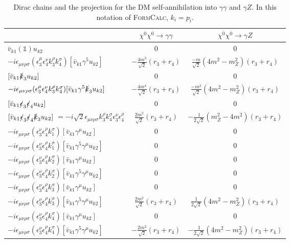 \begin{table}
\centering
\begin{tabular}{|l|c|c|}\hline
& $\chi^0\chi^0\rightarrow\gamma\gamma$ & $\chi^0\chi^0\rightarrow\gamma Z$ \\ \hline \hline
$\bar{v}_{k1}(\mathds{1})u_{k2}$ &  $ 0$ &0 \\ \hline
$-i\epsilon_{\mu\nu\rho\sigma}(\epsilon_3^{\mu}\epsilon_4^{\nu}k_3^{\rho}k_4^{\sigma})[\bar{v}_{k1}\gamma^5u_{k2}]$  & $ -\tfrac{4m^3}{\sqrt{2}}(r_3+r_4)$ &
$\tfrac{-m}{\sqrt{2}}(4m^2-m_Z^2)(r_3+r_4)$\\ \hline 
$[\bar{v}_{k1}\slashed{k}_3u_{k2}]$  & $ 0$ &0\\ \hline 
$-i\epsilon_{\mu\nu\rho\sigma}(\epsilon_3^{\mu}\epsilon_4^{\nu}k_3^{\rho}k_4^{\sigma})[\bar{v}_{k1}\gamma^5\slashed{k}_3u_{k2}]$  & $-\tfrac{4m^4}{\sqrt{2}}(r_3+r_4)$ &
$\tfrac{-m^2}{\sqrt{2}}(4m^2-m_Z^2)(r_3+r_4)$\\ \hline 
$[\bar{v}_{k1}\slashed{\epsilon}_3\slashed{\epsilon}_4u_{k2}]$  &$ 0$ &0\\ \hline 
$[\bar{v}_{k1}\slashed{\epsilon}_3\slashed{\epsilon}_4\slashed{k}_3u_{k2}]$ 
$=-i\sqrt{2}\epsilon_{\mu\nu\rho\sigma}k_3^{\rho}k_4^{\sigma}\epsilon_3^{\nu}\epsilon_4^{\rho}$  & $\tfrac{2m^2}{\sqrt{2}}(r_3+r_4)$ & $ -\tfrac{1}{2\sqrt{2}}(m_Z^2-4m^2)(r_3+r_4)$  \\ \hline 
$-i\epsilon_{\mu\nu\rho\sigma}(\epsilon_3^{\nu}\epsilon_4^{\rho}k_1^{\sigma})[\bar{v}_{k1}\gamma^{\mu}u_{k2}]$  & $ 0$ & 0\\ \hline 
$-i\epsilon_{\mu\nu\rho\sigma}(\epsilon_3^{\nu}\epsilon_4^{\rho}k_1^{\sigma})[\bar{v}_{k1}\gamma^5\gamma^{\mu}u_{k2}]$  & $ 0$ & 0\\ \hline 
$-i\epsilon_{\mu\nu\rho\sigma}(\epsilon_3^{\nu}\epsilon_4^{\rho}k_2^{\sigma})[\bar{v}_{k1}\gamma^{\mu}u_{k2}]$  & $ 0$ &0\\ \hline 
$-i\epsilon_{\mu\nu\rho\sigma}(\epsilon_3^{\nu}\epsilon_4^{\rho}k_2^{\sigma})[\bar{v}_{k1}\gamma^5\gamma^{\mu}u_{k2}]$  & $ 0$ & 0\\ \hline 
$-i\epsilon_{\mu\nu\rho\sigma}(\epsilon_3^{\nu}\epsilon_4^{\rho}k_3^{\sigma})[\bar{v}_{k1}\gamma^{\mu}u_{k2}]$  & $0$ & 0\\ \hline 
$-i\epsilon_{\mu\nu\rho\sigma}(\epsilon_3^{\nu}\epsilon_4^{\rho}k_3^{\sigma})[\bar{v}_{k1}\gamma^5\gamma^{\mu}u_{k2}]$  & $ \tfrac{2m^2}{\sqrt{2}}(r_3+r_4)$ & 
$\tfrac{1}{2\sqrt{2}}(4m^2-m_Z^2)(r_3+r_4)$\\ \hline 
$-i\epsilon_{\mu\nu\rho\sigma}(\epsilon_3^{\nu}\epsilon_4^{\rho}k_4^{\sigma})[\bar{v}_{k1}\gamma^{\mu}u_{k2}]$  & $0$ & 0 \\ \hline 
$-i\epsilon_{\mu\nu\rho\sigma}(\epsilon_3^{\nu}\epsilon_4^{\rho}k_4^{\sigma})[\bar{v}_{k1}\gamma^5\gamma^{\mu}u_{k2}]$  & $-\tfrac{2m^2}{\sqrt{2}}(r_3+r_4)$ &
$-\tfrac{1}{2\sqrt{2}}(4m^2-m_Z^2)(r_3+r_4)$\\ \hline 
\end{tabular}
  \caption{Dirac chains and the projection for the DM self-annihilation into $\gamma\gamma$ and $\gamma Z$. In this notation of \textsc{FormCalc}, $k_i=p_i$.}
  \label{tab:dirac-chains}
\end{table}

